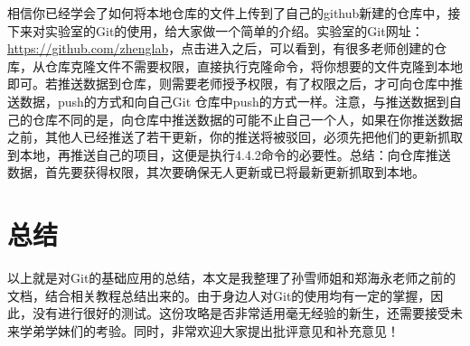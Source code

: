 \documentclass{article}
\begin{document}
相信你已经学会了如何将本地仓库的文件上传到了自己的github新建的仓库中，接下来对实验室的Git的使用，给大家做一个简单的介绍。实验室的Git网址：\url{https://github.com/zhenglab}，点击进入之后，可以看到，有很多老师创建的仓库，从仓库克隆文件不需要权限，直接执行克隆命令，将你想要的文件克隆到本地即可。若推送数据到仓库，则需要老师授予权限，有了权限之后，才可向仓库中推送数据，push的方式和向自己Git 仓库中push的方式一样。注意，与推送数据到自己的仓库不同的是，向仓库中推送数据的可能不止自己一个人，如果在你推送数据之前，其他人已经推送了若干更新，你的推送将被驳回，必须先把他们的更新抓取到本地，再推送自己的项目，这便是执行4.4.2命令的必要性。总结：向仓库推送数据，首先要获得权限，其次要确保无人更新或已将最新更新抓取到本地。

\section{总结}

以上就是对Git的基础应用的总结，本文是我整理了孙雪师姐和郑海永老师之前的文档，结合相关教程总结出来的。由于身边人对Git的使用均有一定的掌握，因此，没有进行很好的测试。这份攻略是否非常适用毫无经验的新生，还需要接受未来学弟学妹们的考验。同时，非常欢迎大家提出批评意见和补充意见！
\end{document}
